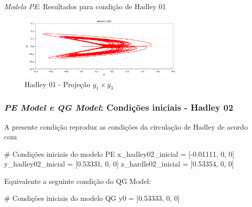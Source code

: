 
\begin{frame}{\textit{Modelo PE}: Resultados para condição de Hadley 01}
	\begin{figure}
		\centering
		\includegraphics[width=0.7\textwidth]{img/p02y1y3.png}
		\caption{Hadley 01 - Projeção $y_1 \times y_3$}
		\label{fig:p02y1y3}
	\end{figure}
\end{frame}


\begin{frame}[fragile]
	
	\frametitle{\textit{PE Model e QG Model}: Condições iniciais - Hadley 02}
	A presente condição reproduz as condições da circulação de Hadley de acordo com \cite{lorenz1980}
	\begin{python}
# Condições iniciais do modelo PE
x_hadley02_inicial = [-0.01111, 0, 0]
y_hadley02_inicial = [0.53331, 0, 0]
z_hardle02_inicial = [0.53354, 0, 0]
	\end{python}
	
	Equivalente a seguinte condição do QG Model:
	\begin{python}
# Condições iniciais do modelo QG
y0 = [0.53333, 0, 0]
	\end{python}
\end{frame}


